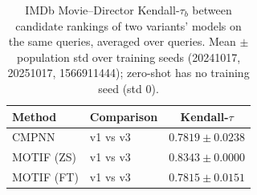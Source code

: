 \begin{table}[t]
\centering
\small
\begin{tabular}{||l||l||c||}
\hline
\textbf{Method} & \textbf{Comparison} & \textbf{Kendall-$\tau$} \\
\hline\hline
CMPNN & v1 vs v3 & $0.7819 \pm 0.0238$ \\
\hline
\hline
MOTIF (ZS) & v1 vs v3 & $0.8343 \pm 0.0000$ \\
\hline
\hline
MOTIF (FT) & v1 vs v3 & $0.7815 \pm 0.0151$ \\
\hline
\end{tabular}
\caption{IMDb Movie--Director Kendall-$\tau_b$ between candidate rankings of two variants' models on the same queries, averaged over queries. Mean $\pm$ population std over training seeds (20241017, 20251017, 1566911444); zero-shot has no training seed (std 0). }
\label{tab:imdb_movie_director_seed_invariance}
\end{table}
